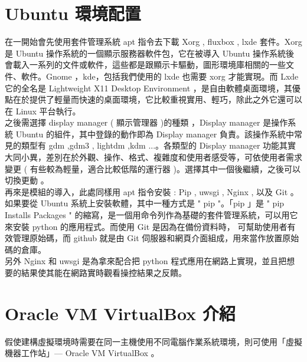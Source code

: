 \documentclass[14pt,a4paper]{report}  %
\begin{document}
\section{Ubuntu 環境配置}
 在一開始會先使用套件管理系統 apt 指令去下載 Xorg , fluxbox , lxde 套件。Xorg 是 Ubuntu 操作系統的一個顯示服務器軟件包，它在被導入 Ubuntu 操作系統後會載入一系列的文件或軟件，這些都是跟顯示卡驅動，圖形環境庫相關的一些文件、軟件。Gnome ，kde，包括我們使用的 lxde 也需要 xorg 才能實現。而 Lxde 它的全名是 Lightweight X11 Desktop Environment ，是自由軟體桌面環境，其優點在於提供了輕量而快速的桌面環境，它比較重視實用、輕巧，除此之外它還可以在 Linux 平台執行。\\
 
 之後需選擇 display manager ( 顯示管理器 )的種類 ，Display manager 是操作系統 Ubuntu 的組件，其中登錄的動作即為 Display manager 負責。該操作系統中常見的類型有 gdm ,gdm3 , lightdm ,kdm ...。各類型的 Display manager 功能其實大同小異，差別在於外觀、操作、格式、複雜度和使用者感受等，可依使用者需求變更 ( 有些較為輕量，適合比較低階的運行器 )。選擇其中一個後繼續，之後可以切換更動 。\\

 再來是模組的導入，此處同樣用 apt 指令安裝 : Pip , uwsgi , Nginx  , 以及 Git 。如果要從 Ubuntu 系統上安裝軟體，其中一種方式是 " pip "。「pip 」是 " pip Installs Packages " 的縮寫，是一個用命令列作為基礎的套件管理系統，可以用它來安裝 python 的應用程式。而使用 Git 是因為在備份資料時， 可幫助使用者有效管理原始碼，而 github 就是由 Git 伺服器和網頁介面組成，用來當作放置原始碼的倉庫。\\
 
 另外 Nginx 和 uwsgi 是為拿來配合把 python 程式應用在網路上實現，並且把想要的結果使其能在網路實時觀看操控結果之反饋。\\
\section{Oracle VM VirtualBox 介紹}
 假使建構虛擬環境時需要在同一主機使用不同電腦作業系統環境，則可使用「虛擬機器工作站」— Oracle VM VirtualBox 。\\
\end{document}
